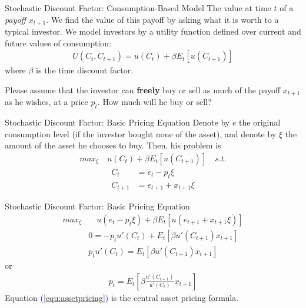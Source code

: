 \documentclass{beamer}
\begin{document}
\begin{frame}{Stochastic Discount Factor: Consumption-Based Model}
	The value at time $ t $ of a \textit{payoff} $ x_{t+1} $. We find the value of this payoff by asking what it is worth to a typical investor. We model investors by a utility function defined
	over current and future values of consumption:
	\begin{align*}
		U(C_t,C_{t+1}) = u(C_t) + \beta E_t[u(C_{t+1})]
	\end{align*}
where $\beta$ is the time discount factor.

Please assume that the investor can \textbf{freely} buy or sell as much of the payoff $ x_{t+1} $ as he wishes, at a price $ p_t $. How much will he buy or sell?
\end{frame}

\begin{frame}{Stochastic Discount Factor: Basic Pricing Equation}
	Denote by $ e $ the original consumption level (if the investor bought none of the asset), and denote by $ \xi $ the amount of the asset he chooses to buy. Then, his problem is
	\begin{align*}
		max_{\xi } \quad u(C_t) + \beta E_t[u(C_{t+1})] \quad s.t.
	\end{align*}
	\begin{align*}
		C_t &= e_t - p_t \xi \\
		C_{t+1} &= e_{t+1} + x_{t+1}\xi
	\end{align*}
\end{frame}

\begin{frame}{Stochastic Discount Factor: Basic Pricing Equation}
	\begin{align*}
		max_{\xi } & \quad u(e_t - p_t \xi) + \beta E_t[u(e_{t+1} + x_{t+1}\xi)] \\
		&0 = - p_{t}{u}'(C_t) + E_{t} \left [ \beta {u}'(C_{t+1}) x_{t+1}\right ] \\
		& p_{t}{u}'(C_t) = E_{t} \left [ \beta {u}'(C_{t+1}) x_{t+1}\right ]
	\end{align*}
	or
	\begin{align}
		p_{t} = E_{t} \left [ \beta \frac{{u}'(C_{t+1})}{{u}'(C_t)}x_{t+1} \right ]
		\label{equ:assetpricing}
	\end{align}
	Equation \textcolor{blue}{(\ref{equ:assetpricing})} is the central asset pricing formula.
\end{frame}
\end{document}
